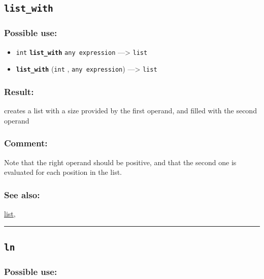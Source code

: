 \documentclass[]{book}
\providecommand{\tightlist}{%
  \setlength{\itemsep}{0pt}\setlength{\parskip}{0pt}}
\theoremstyle{definition}
\theoremstyle{definition}
\theoremstyle{definition}
\theoremstyle{remark}
\begin{document}
\subsection{\texorpdfstring{\texttt{list\_with}}{list\_with}}\label{list_with}

\subsubsection{Possible use:}\label{possible-use-324}

\begin{itemize}
\tightlist
\item
  \texttt{int} \textbf{\texttt{list\_with}} \texttt{any\ expression}
  ---\textgreater{} \texttt{list}
\item
  \textbf{\texttt{list\_with}} (\texttt{int} , \texttt{any\ expression})
  ---\textgreater{} \texttt{list}
\end{itemize}

\subsubsection{Result:}\label{result-314}

creates a list with a size provided by the first operand, and filled
with the second operand

\subsubsection{Comment:}\label{comment-61}

Note that the right operand should be positive, and that the second one
is evaluated for each position in the list.

\subsubsection{See also:}\label{see-also-127}

\href{OperatorsIM\#list}{list},

\begin{center}\rule{0.5\linewidth}{\linethickness}\end{center}

\subsection{\texorpdfstring{\texttt{ln}}{ln}}\label{ln}

\subsubsection{Possible use:}\label{possible-use-325}
\end{document}
